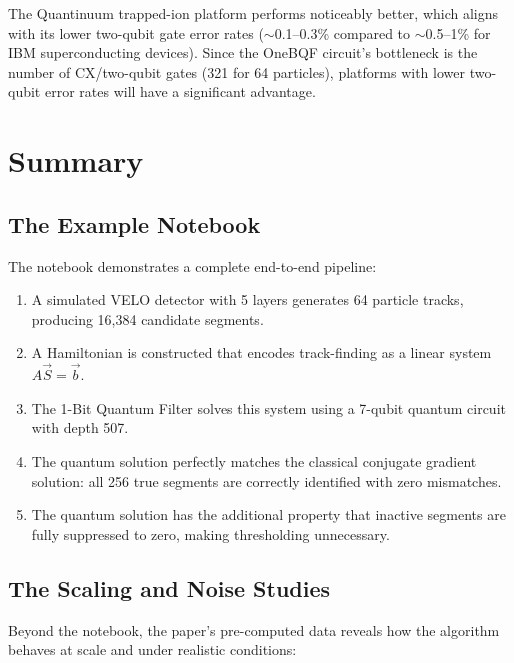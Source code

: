 \documentclass[11pt, a4paper]{article}
\begin{document}
The Quantinuum trapped-ion platform performs noticeably better, which
aligns with its lower two-qubit gate error rates ($\sim$0.1--0.3\%
compared to $\sim$0.5--1\% for IBM superconducting devices). Since the
OneBQF circuit's bottleneck is the number of CX/two-qubit gates (321 for
64 particles), platforms with lower two-qubit error rates will have a
significant advantage.

\section{Summary}

\subsection{The Example Notebook}

The notebook demonstrates a complete end-to-end pipeline:

\begin{enumerate}
    \item A simulated VELO detector with 5 layers generates 64 particle
          tracks, producing 16,384 candidate segments.
    \item A Hamiltonian is constructed that encodes track-finding as a
          linear system $A\vec{S} = \vec{b}$.
    \item The 1-Bit Quantum Filter solves this system using a 7-qubit
          quantum circuit with depth 507.
    \item The quantum solution perfectly matches the classical conjugate
          gradient solution: all 256 true segments are correctly
          identified with zero mismatches.
    \item The quantum solution has the additional property that inactive
          segments are fully suppressed to zero, making thresholding
          unnecessary.
\end{enumerate}

\subsection{The Scaling and Noise Studies}

Beyond the notebook, the paper's pre-computed data reveals how the
algorithm behaves at scale and under realistic conditions:
\end{document}
